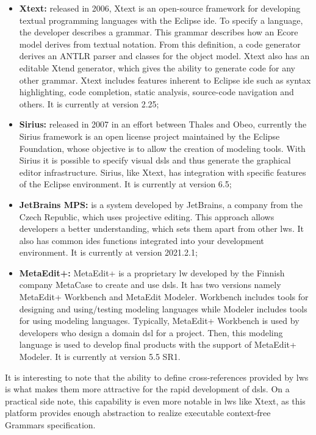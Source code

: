 \begin{itemize}
    \item \textbf{Xtext:} released in 2006, Xtext is an open-source framework for developing textual programming languages with the Eclipse \ac{ide}.
    To specify a language, the developer describes a grammar.
    This grammar describes how an Ecore model derives from textual notation.
    From this definition, a code generator derives an ANTLR parser and classes for the object model.
    Xtext also has an editable Xtend generator, which gives the ability to generate code for any other grammar.
    Xtext includes features inherent to Eclipse \ac{ide} such as syntax highlighting, code completion, static analysis, source-code navigation and others.
    It is currently at version 2.25;
    
    \item \textbf{Sirius:} released in 2007 in an effort between Thales and Obeo, currently the Sirius framework is an open license project maintained by the Eclipse Foundation, whose objective is to allow the creation of modeling tools.
    With Sirius it is possible to specify visual \acp{dsl} and thus generate the graphical editor infrastructure.
    Sirius, like Xtext, has integration with specific features of the Eclipse environment. It is currently at version 6.5;
    
    \item \textbf{JetBrains MPS:} is a system developed by JetBrains, a company from the Czech Republic, which uses projective editing.
    This approach allows developers a better understanding, which sets them apart from other \acp{lw}.
    It also has common \acp{ide} functions integrated into your development environment.
    It is currently at version 2021.2.1;
    
    \item \textbf{MetaEdit+:} MetaEdit+ is a proprietary \ac{lw} developed by the Finnish company MetaCase to create and use \acp{dsl}.
    It has two versions namely MetaEdit+ Workbench and MetaEdit Modeler.
    Workbench includes tools for designing and using/testing modeling languages while Modeler includes tools for using modeling languages.
    Typically, MetaEdit+ Workbench is used by developers who design a domain \ac{dsl} for a project.
    Then, this modeling language is used to develop final products with the support of MetaEdit+ Modeler.
    It is currently at version 5.5 SR1.
\end{itemize}

It is interesting to note that the ability to define cross-references provided by \acp{lw} is what makes them more attractive for the rapid development of \acp{dsl}. 
On a practical side note, this capability is even more notable in \acp{lw} like Xtext, as this platform provides enough abstraction to realize executable context-free Grammars specification.

